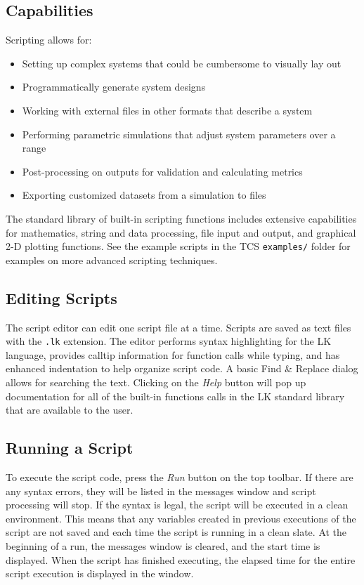\documentclass{article}
\begin{document}
\subsection{Capabilities}

Scripting allows for:
\begin{itemize}
\item Setting up complex systems that could be cumbersome to visually lay out
\item Programmatically generate system designs
\item Working with external files in other formats that describe a system
\item Performing parametric simulations that adjust system parameters over a range
\item Post-processing on outputs for validation and calculating metrics
\item Exporting customized datasets from a simulation to files
\end{itemize}

The standard library of built-in scripting functions includes extensive capabilities for mathematics, string and data processing, file input and output, and graphical 2-D plotting functions.  See the example scripts in the TCS \texttt{examples/} folder for examples on more advanced scripting techniques.

\subsection{Editing Scripts}

The script editor can edit one script file at a time.  Scripts are saved as text files with the \texttt{.lk} extension.  The editor performs syntax highlighting for the LK language, provides calltip information for function calls while typing, and has enhanced indentation to help organize script code.  A basic Find \& Replace dialog allows for searching the text.  Clicking on the \emph{Help} button will pop up documentation for all of the built-in functions calls in the LK standard library that are available to the user.

\subsection{Running a Script}

To execute the script code, press the \emph{Run} button on the top toolbar.  If there are any syntax errors, they will be listed in the messages window and script processing will stop.  If the syntax is legal, the script will be executed in a clean environment.  This means that any variables created in previous executions of the script are not saved and each time the script is running in a clean slate.  At the beginning of a run, the messages window is cleared, and the start time is displayed.  When the script has finished executing, the elapsed time for the entire script execution is displayed in the window.
\end{document}
